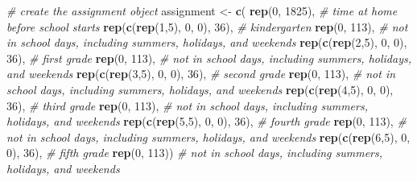 \documentclass[english,floatsintext,jou]{apa6}
\newenvironment{Shaded}{\begin{snugshade}}{\end{snugshade}}
\newcommand{\KeywordTok}[1]{\textcolor[rgb]{0.13,0.29,0.53}{\textbf{{#1}}}}
\newcommand{\DecValTok}[1]{\textcolor[rgb]{0.00,0.00,0.81}{{#1}}}
\newcommand{\StringTok}[1]{\textcolor[rgb]{0.31,0.60,0.02}{{#1}}}
\newcommand{\CommentTok}[1]{\textcolor[rgb]{0.56,0.35,0.01}{\textit{{#1}}}}
\newcommand{\NormalTok}[1]{{#1}}
\theoremstyle{definition}
\theoremstyle{definition}
\theoremstyle{definition}
\theoremstyle{remark}
\begin{document}
\begin{appendix}
\begin{Shaded}
\begin{Highlighting}[]
\CommentTok{# create the assignment object}
\NormalTok{assignment <-}\StringTok{ }\KeywordTok{c}\NormalTok{(}
\KeywordTok{rep}\NormalTok{(}\DecValTok{0}\NormalTok{, }\DecValTok{1825}\NormalTok{),   }\CommentTok{# time at home before school starts}
\KeywordTok{rep}\NormalTok{(}\KeywordTok{c}\NormalTok{(}\KeywordTok{rep}\NormalTok{(}\DecValTok{1}\NormalTok{,}\DecValTok{5}\NormalTok{), }\DecValTok{0}\NormalTok{, }\DecValTok{0}\NormalTok{), }\DecValTok{36}\NormalTok{),    }\CommentTok{# kindergarten}
\KeywordTok{rep}\NormalTok{(}\DecValTok{0}\NormalTok{, }\DecValTok{113}\NormalTok{),    }\CommentTok{# not in school days, including summers, holidays, and weekends}
\KeywordTok{rep}\NormalTok{(}\KeywordTok{c}\NormalTok{(}\KeywordTok{rep}\NormalTok{(}\DecValTok{2}\NormalTok{,}\DecValTok{5}\NormalTok{), }\DecValTok{0}\NormalTok{, }\DecValTok{0}\NormalTok{), }\DecValTok{36}\NormalTok{),    }\CommentTok{# first grade}
\KeywordTok{rep}\NormalTok{(}\DecValTok{0}\NormalTok{, }\DecValTok{113}\NormalTok{),    }\CommentTok{# not in school days, including summers, holidays, and weekends}
\KeywordTok{rep}\NormalTok{(}\KeywordTok{c}\NormalTok{(}\KeywordTok{rep}\NormalTok{(}\DecValTok{3}\NormalTok{,}\DecValTok{5}\NormalTok{), }\DecValTok{0}\NormalTok{, }\DecValTok{0}\NormalTok{), }\DecValTok{36}\NormalTok{),    }\CommentTok{# second grade}
\KeywordTok{rep}\NormalTok{(}\DecValTok{0}\NormalTok{, }\DecValTok{113}\NormalTok{),    }\CommentTok{# not in school days, including summers, holidays, and weekends}
\KeywordTok{rep}\NormalTok{(}\KeywordTok{c}\NormalTok{(}\KeywordTok{rep}\NormalTok{(}\DecValTok{4}\NormalTok{,}\DecValTok{5}\NormalTok{), }\DecValTok{0}\NormalTok{, }\DecValTok{0}\NormalTok{), }\DecValTok{36}\NormalTok{),    }\CommentTok{# third grade}
\KeywordTok{rep}\NormalTok{(}\DecValTok{0}\NormalTok{, }\DecValTok{113}\NormalTok{),    }\CommentTok{# not in school days, including summers, holidays, and weekends}
\KeywordTok{rep}\NormalTok{(}\KeywordTok{c}\NormalTok{(}\KeywordTok{rep}\NormalTok{(}\DecValTok{5}\NormalTok{,}\DecValTok{5}\NormalTok{), }\DecValTok{0}\NormalTok{, }\DecValTok{0}\NormalTok{), }\DecValTok{36}\NormalTok{),    }\CommentTok{# fourth grade}
\KeywordTok{rep}\NormalTok{(}\DecValTok{0}\NormalTok{, }\DecValTok{113}\NormalTok{),    }\CommentTok{# not in school days, including summers, holidays, and weekends}
\KeywordTok{rep}\NormalTok{(}\KeywordTok{c}\NormalTok{(}\KeywordTok{rep}\NormalTok{(}\DecValTok{6}\NormalTok{,}\DecValTok{5}\NormalTok{), }\DecValTok{0}\NormalTok{, }\DecValTok{0}\NormalTok{), }\DecValTok{36}\NormalTok{),    }\CommentTok{# fifth grade}
\KeywordTok{rep}\NormalTok{(}\DecValTok{0}\NormalTok{, }\DecValTok{113}\NormalTok{))    }\CommentTok{# not in school days, including summers, holidays, and weekends}


\end{Highlighting}
\end{Shaded}
\end{appendix}
\end{document}

